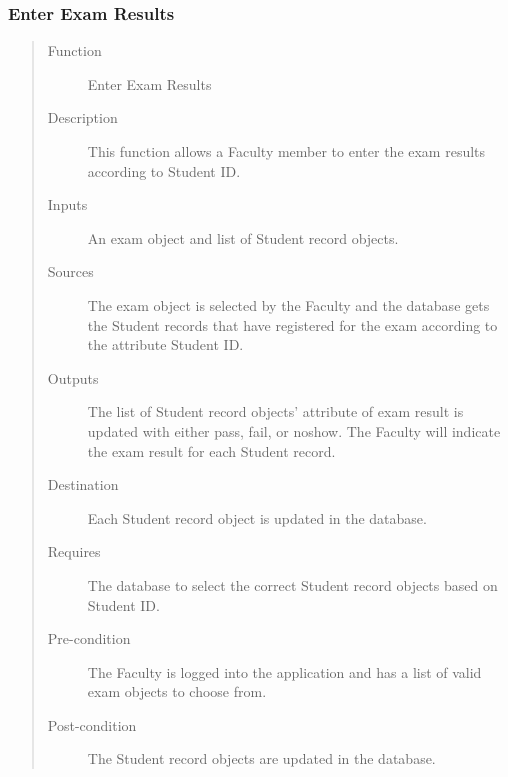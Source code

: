 \subsubsection{Enter Exam Results} 
\begin{quote} %
\begin{description}
\item[Function]
   Enter Exam Results
\item[Description]
   This function allows a Faculty member to enter the exam results
   according to Student ID.
\item[Inputs]
   An exam object and list of Student record objects.
\item[Sources]
   The exam object is selected by the Faculty and the database gets the Student
   records that have registered for the exam according to the attribute
   Student ID.
\item[Outputs]
   The list of Student record objects' attribute of exam result is updated with
   either pass, fail, or noshow. The Faculty will indicate the exam result for each
   Student record.
\item[Destination]
   Each Student record object is updated in the database.
\item[Requires]
   The database to select the correct Student record objects based on Student ID.
\item[Pre-condition]
   The Faculty is logged into the application and has a list of valid exam objects
   to choose from.
\item[Post-condition]
   The Student record objects are updated in the database.
\end{description}
\end{quote} %

